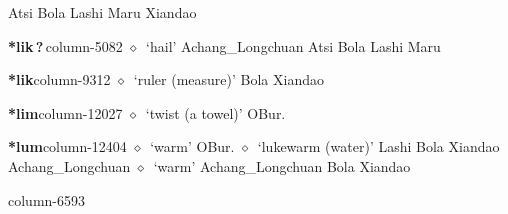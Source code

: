 \hspace{1ex}
         Atsi 
\hspace{1ex}
         Bola 
\hspace{1ex}
         Lashi 
\hspace{1ex}
         Maru 
\hspace{1ex}
         Xiandao 
  \item {\footnotesize \textbf{*lik\,?\,}}{\tiny column-5082}
         $\diamond$~`hail'
         Achang\_Longchuan 
\hspace{1ex}
         Atsi 
\hspace{1ex}
         Bola 
\hspace{1ex}
         Lashi 
\hspace{1ex}
         Maru 
  \item {\footnotesize \textbf{*lik}}{\tiny column-9312}
         $\diamond$~`ruler (measure)'
         Bola 
\hspace{1ex}
         Xiandao 
  \item {\footnotesize \textbf{*lim}}{\tiny column-12027}
         $\diamond$~`twist (a towel)'
         OBur. 
  \item {\footnotesize \textbf{*lum}}{\tiny column-12404}
         $\diamond$~`warm'
         OBur. 
\hspace{1ex}
         $\diamond$~`lukewarm (water)'
         Lashi 
\hspace{1ex}
         Bola 
\hspace{1ex}
         Xiandao 
\hspace{1ex}
         Achang\_Longchuan 
\hspace{1ex}
         $\diamond$~`warm'
         Achang\_Longchuan 
\hspace{1ex}
         Bola 
\hspace{1ex}
         Xiandao 
  \item {\footnotesize \textbf{}}{\tiny column-6593}
